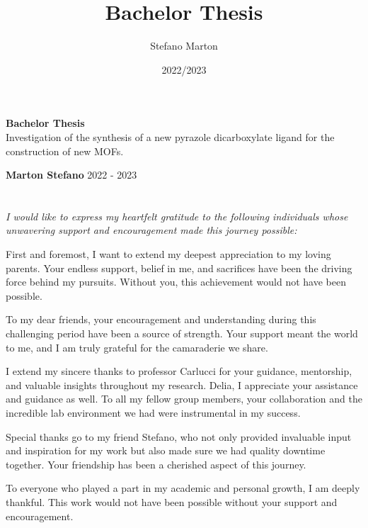 \documentclass[a4,11pt,openright]{report}
\title{Bachelor Thesis}
\author{Stefano Marton}
\date{2022/2023}
\begin{document}
\begin{titlepage}
	\begin{center}
		\vspace*{6cm}
		\Huge
		\textbf{Bachelor Thesis}\\
		\vspace{0.5cm}
		\LARGE
		\vspace{1.5cm}
		Investigation of the synthesis of a new pyrazole dicarboxylate ligand for the construction of new MOFs.

		\vspace{1.5cm}
		\textbf{Marton Stefano}
		\vfill
		2022 - 2023
		\vspace{0.8cm}
	\end{center}
\end{titlepage}
\vspace{1cm}

\afterpage{\blankpage}

\chapter*{} %
\vspace*{\fill}
\begin{flushleft}
	\it
	I would like to express my heartfelt gratitude to the following individuals whose unwavering support and encouragement made this journey possible:

	First and foremost, I want to extend my deepest appreciation to my loving parents. Your endless support, belief in me, and sacrifices have been the driving force behind my pursuits. Without you, this achievement would not have been possible.

	To my dear friends, your encouragement and understanding during this challenging period have been a source of strength. Your support meant the world to me, and I am truly grateful for the camaraderie we share.

	I extend my sincere thanks to professor Carlucci for your guidance, mentorship, and valuable insights throughout my research. Delia, I appreciate your assistance and guidance as well. To all my fellow group members, your collaboration and the incredible lab environment we had were instrumental in my success.

	Special thanks go to my friend Stefano, who not only provided invaluable input and inspiration for my work but also made sure we had quality downtime together. Your friendship has been a cherished aspect of this journey.

	To everyone who played a part in my academic and personal growth, I am deeply thankful. This work would not have been possible without your support and encouragement.
	\vspace*{\fill}

\end{flushleft}
\vspace*{\fill}
\end{document}
